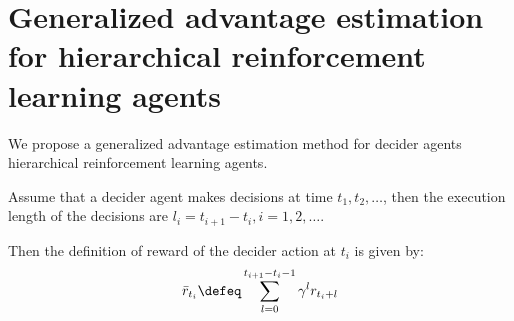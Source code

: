 \section{Generalized advantage estimation for hierarchical reinforcement learning agents}
We propose a generalized advantage estimation method for decider agents hierarchical reinforcement learning agents. 

Assume that a decider agent makes decisions at time $t_1,t_2,\dots$, then the execution length of the decisions are $l_i = t_{i+1} - t_i, i=1,2,\dots$.

Then the definition of reward of the decider action at $t_i$ is given by:
\begin{align}
\bar{r}_{t_i} \defeq
 \sum_{l=0}^{t_{i+1}-t_i-1}
  \gamma^l r_{t_i+l}
\end{align}

